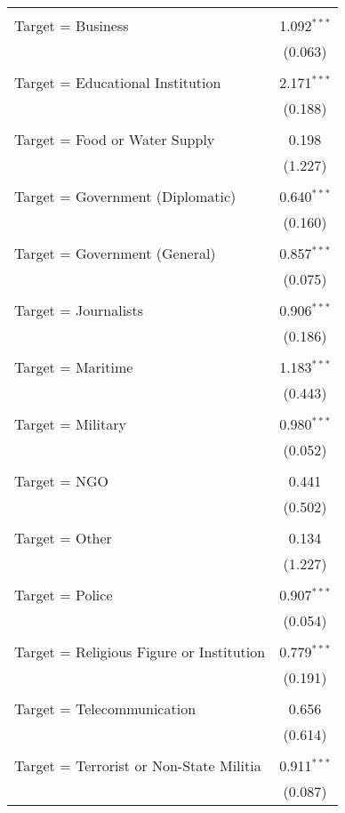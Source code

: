 \begin{table}[!htbp]
\begin{tabular}{@{\extracolsep{5pt}}lc}
  & \\ 
 Target = Business & 1.092$^{***}$ \\ 
  & (0.063) \\ 
  & \\ 
 Target = Educational Institution & 2.171$^{***}$ \\ 
  & (0.188) \\ 
  & \\ 
 Target = Food or Water Supply & 0.198 \\ 
  & (1.227) \\ 
  & \\ 
 Target = Government (Diplomatic) & 0.640$^{***}$ \\ 
  & (0.160) \\ 
  & \\ 
 Target =  Government (General) & 0.857$^{***}$ \\ 
  & (0.075) \\ 
  & \\ 
 Target = Journalists & 0.906$^{***}$ \\ 
  & (0.186) \\ 
  & \\ 
 Target = Maritime & 1.183$^{***}$ \\ 
  & (0.443) \\ 
  & \\ 
 Target = Military & 0.980$^{***}$ \\ 
  & (0.052) \\ 
  & \\ 
 Target = NGO & 0.441 \\ 
  & (0.502) \\ 
  & \\ 
 Target = Other & 0.134 \\ 
  & (1.227) \\ 
  & \\ 
 Target = Police & 0.907$^{***}$ \\ 
  & (0.054) \\ 
  & \\ 
 Target = Religious Figure or Institution & 0.779$^{***}$ \\ 
  & (0.191) \\ 
  & \\ 
 Target = Telecommunication & 0.656 \\ 
  & (0.614) \\ 
  & \\ 
 Target = Terrorist or Non-State Militia & 0.911$^{***}$ \\ 
  & (0.087) \\ 

\end{tabular}
\end{table}
